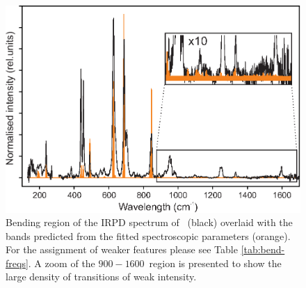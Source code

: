 \begin{figure}
    \centering
    \includegraphics{chapters/HC3N+/overlay_FIT_pred.eps}
    \caption{Bending region of the IRPD spectrum of \neion\ (black) overlaid with the bands predicted from the fitted spectroscopic parameters (orange). For the assignment of weaker
    features please see Table \ref{tab:bend-freqs}. A zoom of the $900-1600$~\wn region is presented to show the large density of transitions of weak intensity.}
    \label{fig:FIT_overlay}
\end{figure}


